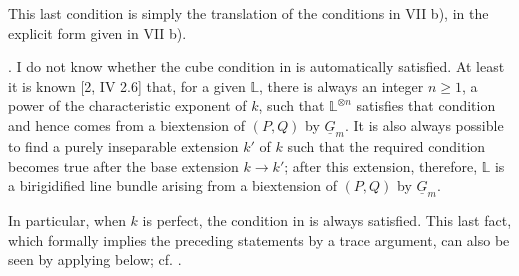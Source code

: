 This last condition is simply the translation of the conditions in
VII  b), in the explicit form given in VII  b).

\medskip
\noindent {}.  I do not know whether the cube condition in  is
automatically satisfied.  At least it is known [2, IV 2.6] that, for
a given $\mathbb L$, there is always an integer $n\geq1$, a power of
the characteristic exponent of $k$, such that
$\mathbb L^{\otimes n}$ satisfies that condition and hence comes from
a biextension of $(P,Q)$ by $\underline G_m$.  It is also always
possible to find a purely inseparable extension $k'$ of $k$ such that
the required condition becomes true after the base extension
$k\longrightarrow k'$; after this extension, therefore, $\mathbb L$
is a birigidified line bundle arising from a biextension of $(P,Q)$
by $\underline G_m$.

In particular, when $k$ is perfect, the condition in  is always
satisfied.  This last fact, which formally implies the preceding
statements by a trace argument, can also be seen by applying 
below; cf. .


